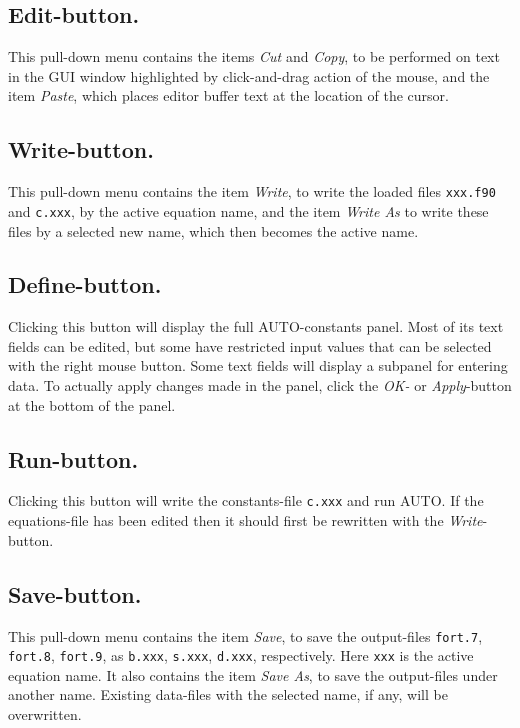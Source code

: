 \documentclass[12pt]{report}
\begin{document}
\subsection{ Edit-button.}
This pull-down menu contains the items
{\it Cut} and {\it Copy}, 
to be performed on text in the GUI window
highlighted by click-and-drag action of the mouse,
and the item {\it Paste}, which places editor buffer text at the
location of the cursor.



\subsection{ Write-button.}
This pull-down menu contains the item
{\it Write},
to write the loaded files {\tt xxx.f90} and {\tt c.xxx},
by the active equation name,
and the item
{\it Write As}
to write these files by a selected new name, which then becomes the active name.


\subsection{ Define-button.}
Clicking this button will display the full {\cal AUTO}-constants panel.
Most of its text fields can be edited,
but some have restricted input values that can be selected with
the right mouse button.
Some text fields will display a subpanel for entering data.
To actually apply changes made in the panel, click the
{\it OK-} or {\it Apply}-button at the bottom of the panel.



\subsection{ Run-button.}
Clicking this button will write the constants-file {\tt c.xxx} and run {\cal AUTO}.
If the equations-file has been edited then it should first be rewritten 
with the {\it Write}-button. 


\subsection{ Save-button.}
This pull-down menu contains the item
{\it Save},
to save the output-files {\tt fort.7}, {\tt fort.8}, {\tt fort.9},
as {\tt b.xxx}, {\tt s.xxx}, {\tt d.xxx}, respectively.
Here {\tt xxx} is the active equation name.
It also contains the item
{\it Save As}, 
to save the output-files under another name. 
Existing data-files with the selected name, if any, will be overwritten.
\end{document}
